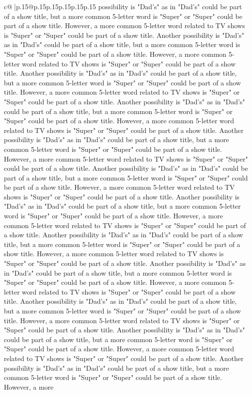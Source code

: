 \documentclass{article}
\begin{document}
{\begin{supertabular}{c@{$\;$}|p{.15\linewidth}@{}p{.15\linewidth}p{.15\linewidth}p{.15\linewidth}p{.15\linewidth}p{.15\linewidth}}
{{{possibility is "Dad's" as in "Dad's" could be part of a show title, but a more common 5{-}letter word is "Super" or "Super" could be part of a show title. However, a more common 5{-}letter word related to TV shows is "Super" or "Super" could be part of a show title. Another possibility is "Dad's" as in "Dad's" could be part of a show title, but a more common 5{-}letter word is "Super" or "Super" could be part of a show title. However, a more common 5{-}letter word related to TV shows is "Super" or "Super" could be part of a show title. Another possibility is "Dad's" as in "Dad's" could be part of a show title, but a more common 5{-}letter word is "Super" or "Super" could be part of a show title. However, a more common 5{-}letter word related to TV shows is "Super" or "Super" could be part of a show title. Another possibility is "Dad's" as in "Dad's" could be part of a show title, but a more common 5{-}letter word is "Super" or "Super" could be part of a show title. However, a more common 5{-}letter word related to TV shows is "Super" or "Super" could be part of a show title. Another possibility is "Dad's" as in "Dad's" could be part of a show title, but a more common 5{-}letter word is "Super" or "Super" could be part of a show title. However, a more common 5{-}letter word related to TV shows is "Super" or "Super" could be part of a show title. Another possibility is "Dad's" as in "Dad's" could be part of a show title, but a more common 5{-}letter word is "Super" or "Super" could be part of a show title. However, a more common 5{-}letter word related to TV shows is "Super" or "Super" could be part of a show title. Another possibility is "Dad's" as in "Dad's" could be part of a show title, but a more common 5{-}letter word is "Super" or "Super" could be part of a show title. However, a more common 5{-}letter word related to TV shows is "Super" or "Super" could be part of a show title. Another possibility is "Dad's" as in "Dad's" could be part of a show title, but a more common 5{-}letter word is "Super" or "Super" could be part of a show title. However, a more common 5{-}letter word related to TV shows is "Super" or "Super" could be part of a show title. Another possibility is "Dad's" as in "Dad's" could be part of a show title, but a more common 5{-}letter word is "Super" or "Super" could be part of a show title. However, a more common 5{-}letter word related to TV shows is "Super" or "Super" could be part of a show title. Another possibility is "Dad's" as in "Dad's" could be part of a show title, but a more common 5{-}letter word is "Super" or "Super" could be part of a show title. However, a more common 5{-}letter word related to TV shows is "Super" or "Super" could be part of a show title. Another possibility is "Dad's" as in "Dad's" could be part of a show title, but a more common 5{-}letter word is "Super" or "Super" could be part of a show title. However, a more common 5{-}letter word related to TV shows is "Super" or "Super" could be part of a show title. Another possibility is "Dad's" as in "Dad's" could be part of a show title, but a more common 5{-}letter word is "Super" or "Super" could be part of a show title. However, a more }}}
\end{supertabular}}
\end{document}
